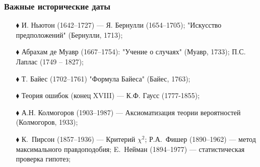 \documentclass[fullscreen=true]{beamer}
\begin{document}
\begin{frame}
\frametitle{Важные исторические даты}
\begin{itemize}
\item[$\blacklozenge$] И. Ньютон (1642--1727) --- Я. Бернулли
(1654--1705); "Искусство предположений" (Бернулли, 1713);

\item[$\blacklozenge$] Абрахам де Муавр (1667--1754): "Учение о
случаях" (Муавр, 1733); П.С. Лаплас (1749 -- 1827);

\item[$\blacklozenge$] Т. Байес (1702--1761) "Формула Байеса"
(Байес, 1763);

\item[$\blacklozenge$] Теория ошибок (конец XVIII) --- К.Ф. Гаусс (1777-1855);

\item[$\blacklozenge$] А.Н. Колмогоров (1903--1987) --- Аксиоматизация
теории вероятностей (Колмогоров, 1933);

\item[$\blacklozenge$] К.~Пирсон (1857--1936) --- Критерий $\chi^2$;
Р.А.~Фишер (1890--1962) --- метод максимального правдоподобия;
E.~Нейман (1894--1977)  --- статистическая
проверка гипотез;
\end{itemize}
\end{frame}
\end{document}
